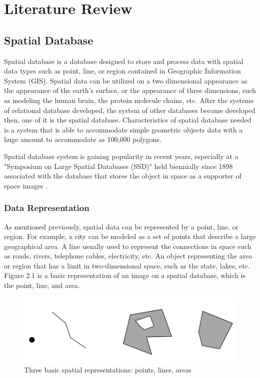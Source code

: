 \chapter{Literature Review}

\section{Spatial Database}
Spatial database is a database designed to store and process data with spatial data types such as point, line, or region contained in Geographic Information System (GIS). Spatial data can be utilized on a two dimensional appearance as the appearance of the earth's surface, or the appearance of three dimensions, such as modeling the human brain, the protein molecule chains, etc. After the systems of relational database developed, the system of other databases become developed then, one of it is the spatial database. Characteristics of spatial database needed is a system that is able to accommodate simple geometric objects data with a huge amount to accommodate as 100,000 polygons.

Spatial database system is gaining popularity in recent years, especially at a "Symposium on Large Spatial Databases (SSD)" held biennially since 1898 associated with the database that stores the object in space as a supporter of space images \cite{okabe2009spatial}.
\subsection{Data Representation}
As mentioned previously, spatial data can be represented by a point, line, or region. For example, a city can be modeled as a set of points that describe a large geographical area. A line usually used to represent the connections in space such as roads, rivers, telephone cables, electricity, etc. An object representing the area or region that has a limit in two-dimensional space, such as the state, lakes, etc. Figure 2.1 is a basic representation of an image on a spatial database, which is the point, line, and area.
\begin{figure}[h!]
	\centering
	\includegraphics[scale=0.5]{figure1.png}
	\caption{Three basic spatial representations: points, lines, areas}
	\label{fig:figure1}
\end{figure}

